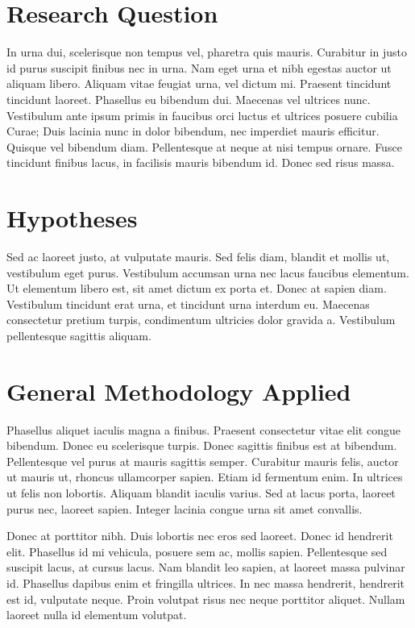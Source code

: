 \documentclass[12pt, a4paper,twoside]{tesi_upf}
\begin{document}
\section{Research Question}

In urna dui, scelerisque non tempus vel, pharetra quis mauris. Curabitur in justo id purus suscipit finibus nec in urna. Nam eget urna et nibh egestas auctor ut aliquam libero. Aliquam vitae feugiat urna, vel dictum mi. Praesent tincidunt tincidunt laoreet. Phasellus eu bibendum dui. Maecenas vel ultrices nunc. Vestibulum ante ipsum primis in faucibus orci luctus et ultrices posuere cubilia Curae; Duis lacinia nunc in dolor bibendum, nec imperdiet mauris efficitur. Quisque vel bibendum diam. Pellentesque at neque at nisi tempus ornare. Fusce tincidunt finibus lacus, in facilisis mauris bibendum id. Donec sed risus massa.

\section{Hypotheses}

Sed ac laoreet justo, at vulputate mauris. Sed felis diam, blandit et mollis ut, vestibulum eget purus. Vestibulum accumsan urna nec lacus faucibus elementum. Ut elementum libero est, sit amet dictum ex porta et. Donec at sapien diam. Vestibulum tincidunt erat urna, et tincidunt urna interdum eu. Maecenas consectetur pretium turpis, condimentum ultricies dolor gravida a. Vestibulum pellentesque sagittis aliquam.

\section{General Methodology Applied}

Phasellus aliquet iaculis magna a finibus. Praesent consectetur vitae elit congue bibendum. Donec eu scelerisque turpis. Donec sagittis finibus est at bibendum. Pellentesque vel purus at mauris sagittis semper. Curabitur mauris felis, auctor ut mauris ut, rhoncus ullamcorper sapien. Etiam id fermentum enim. In ultrices ut felis non lobortis. Aliquam blandit iaculis varius. Sed at lacus porta, laoreet purus nec, laoreet sapien. Integer lacinia congue urna sit amet convallis.

Donec at porttitor nibh. Duis lobortis nec eros sed laoreet. Donec id hendrerit elit. Phasellus id mi vehicula, posuere sem ac, mollis sapien. Pellentesque sed suscipit lacus, at cursus lacus. Nam blandit leo sapien, at laoreet massa pulvinar id. Phasellus dapibus enim et fringilla ultrices. In nec massa hendrerit, hendrerit est id, vulputate neque. Proin volutpat risus nec neque porttitor aliquet. Nullam laoreet nulla id elementum volutpat.
\end{document}
